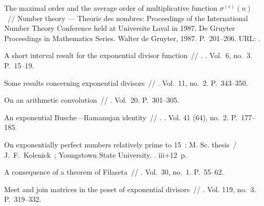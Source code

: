 \documentclass{article}
\begin{document}
\begin{thebibliography}{10}
 The maximal order and the average
  order of multiplicative function $\sigma^{(e)}(n)$~// Number theory ---
  Theorie des nombres: Proceedings of the International Number Theory
  Conference held at Universite Laval in 1987. \BibDash
\newblock De Gruyter Proceedings in Mathematics Series. \BibDash
\newblock Walter de Gruyter, 1987. \BibDash
\newblock P.~201--206. \BibDash
\newblock URL: .

 A short interval result for the exponential divisor
  function~// . \BibDash
{}. \BibDash
\newblock Vol.~6, no.~3. \BibDash
\newblock P.~15--19.

 Some results concerning exponential divisors~//
  \href{http://dx.doi.org/10.1155/S0161171288000407}{} \BibDash
{}. \BibDash
\newblock Vol.~11, no.~2. \BibDash
\newblock P.~343--350.

 On an arithmetic convolution~//
  \href{http://dx.doi.org/10.4153/CMB-1977-046-9}{}
  \BibDash
{}. \BibDash
\newblock Vol.~20. \BibDash
\newblock P.~301--305.

 An exponential Busche---Ramanujan identity~//
  . \BibDash
{}. \BibDash
\newblock Vol. 41 (64), no.~2. \BibDash
\newblock P.~177--185.

 On exponentially perfect numbers relatively prime to
  15~: M. Sc. thesis~/ J.~F.~Kolenick~; Youngstown State University. \BibDash
{}. \BibDash
\newblock iii+12~p.

 A consequence of a
  theorem of Filaseta~//  \BibDash
{}. \BibDash
\newblock Vol.~30, no.~1. \BibDash
\newblock P.~55--62.

 Meet and join matrices in the poset of
  exponential divisors~//
  \href{http://dx.doi.org/10.1007/s12044-009-0031-2}{} \BibDash
{}. \BibDash
\newblock Vol. 119, no.~3. \BibDash
\newblock P.~319--332.


\end{thebibliography}
\end{document}
